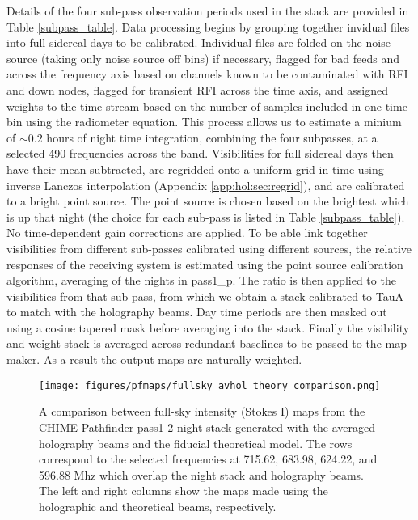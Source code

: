 Details of the four sub-pass observation periods used in the stack are provided in Table \ref{subpass_table}. Data processing begins by grouping together invidual files into full sidereal days to be calibrated. Individual files are folded on the noise source (taking only noise source off bins) if necessary, flagged for bad feeds and across the frequency axis based on channels known to be contaminated with RFI and down nodes, flagged for transient RFI across the time axis, and assigned weights to the time stream based on the number of samples included in one time bin using the radiometer equation. This process allows us to estimate a minium of $\sim 0.2$ hours of night time integration, combining the four subpasses, at a selected 490 frequencies across the band. Visibilities for full sidereal days then have their mean subtracted, are regridded onto a uniform grid in time using inverse Lanczos interpolation (Appendix \ref{app:hol:sec:regrid}), and are calibrated to a bright point source. The point source is chosen based on the brightest which is up that night (the choice for each sub-pass is listed in Table \ref{subpass_table}). No time-dependent gain corrections are applied. To be able link together visibilities from different sub-passes calibrated using different sources, the relative responses of the receiving system is estimated using the point source calibration algorithm, averaging of the nights in pass1\_p. The ratio is then applied to the visibilities from that sub-pass, from which we obtain a stack calibrated to TauA to match with the holography beams. Day time periods are then masked out using a cosine tapered mask before averaging into the stack. Finally the visibility and weight stack is averaged across redundant baselines to be passed to the map maker. As a result the output maps are naturally weighted.

\begin{figure}
\centering
\texttt{[image: figures/pfmaps/fullsky\_avhol\_theory\_comparison.png]}
\caption{A comparison between full-sky intensity (Stokes I) maps from the CHIME Pathfinder pass1-2 night stack generated with the averaged holography beams and the fiducial theoretical model. The rows correspond to the selected frequencies at 715.62, 683.98, 624.22, and 596.88 Mhz which overlap the night stack and holography beams. The left and right columns show the maps made using the holographic and theoretical beams, respectively.}
\label{fullsky_comparison}
\end{figure}

